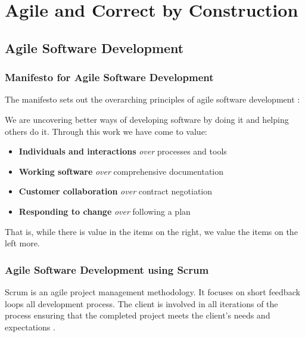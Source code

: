 
\chapter{Agile and Correct by Construction} %

\label{Chapter_Agile_and_Correct_by_Construction} %



\section{Agile Software Development}

\subsection{Manifesto for Agile Software Development}

The manifesto sets out the overarching principles of agile software development \parencite{Beck2001ManifestoFA}:

\begin{displayquote}
We are uncovering better ways of developing software by doing it and helping 
others do it. Through this work we have come to value:

\begin{itemize}
	\item \textbf{Individuals and interactions} \textit{over} processes and tools 
	\item \textbf{Working software} \textit{over} comprehensive documentation 
	\item \textbf{Customer collaboration} \textit{over} contract negotiation 
	\item \textbf{Responding to change} \textit{over} following a plan 
\end{itemize}

That is, while there is value in the items on the right, we value the items on
the left more.
\end{displayquote}

\subsection{Agile Software Development using Scrum}
Scrum is an agile project management methodology. It focuses on short feedback
loops all development process. The client is involved in all iterations of the process
ensuring that the completed project meets the client's needs and expectations \parencite{ScrumGoesFormal}.

